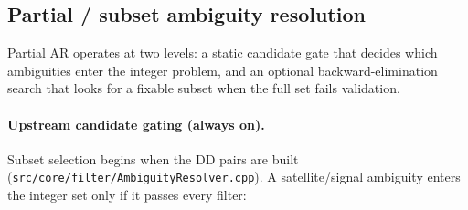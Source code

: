 \documentclass[main.tex]{subfiles}
\begin{document}
\subsection{Partial / subset ambiguity resolution}\label{sec:ar-partial}

Partial AR operates at two levels: a static candidate gate that decides
which ambiguities enter the integer problem, and an optional
backward-elimination search that looks for a fixable subset when the
full set fails validation.

\paragraph{Upstream candidate gating (always on).}
Subset selection begins when the DD pairs are built
(\texttt{src/core/filter/AmbiguityResolver.cpp}).  A satellite/signal
ambiguity enters the integer set only if it passes every filter:
\end{document}
